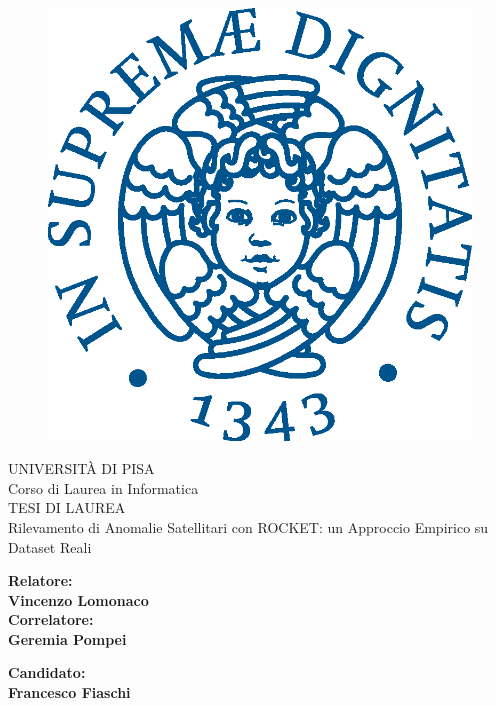 \begin{titlepage}
\begin{figure}
    \centering\includegraphics[scale=0.5]{images/Frontespizio/cherubinFrontespizio.eps}
\end{figure}

\begin{center}
    {\huge{ UNIVERSITÀ DI PISA \\}}
    {\LARGE{ Corso di Laurea in Informatica \\}}
    \vspace{2cm}
    {\Large { TESI DI LAUREA }}\\
    \vspace{0.7cm}
    {\LARGE { Rilevamento di Anomalie Satellitari con ROCKET: un Approccio Empirico su Dataset Reali }}
\end{center}

\vspace{2.5cm}

\begin{minipage}[t]{0.47\textwidth}
	{\large{\bf Relatore:\\ Vincenzo Lomonaco}}
	\vspace{1.2cm}
	{\large{\bf \\Correlatore:\\ Geremia Pompei}}
\end{minipage}\hfill\begin{minipage}[t]{0.47\textwidth}\raggedleft
	{\large{\bf Candidato: \\ Francesco Fiaschi\\ }}
\end{minipage}

\vspace{23mm}
\hrulefill
\\
\end{titlepage}